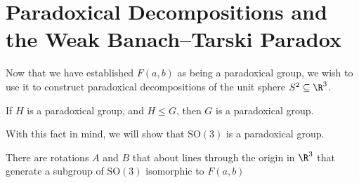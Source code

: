 \section{Paradoxical Decompositions and the Weak Banach--Tarski Paradox}\label{sec:weak_banach_tarski}%
Now that we have established $F(a,b)$ as being a paradoxical group, we wish to use it to construct paradoxical decompositions of the unit sphere $S^2\subseteq \R^3$.
\begin{fact}
  If $H$ is a paradoxical group, and $H\leq G$, then $G$ is a paradoxical group.
\end{fact}
With this fact in mind, we will show that $\text{SO}(3)$ is a paradoxical group.
\begin{theorem}
  There are rotations $A$ and $B$ that about lines through the origin in $\R^3$ that generate a subgroup of $\text{SO}(3)$ isomorphic to $F(a,b)$
\end{theorem}
